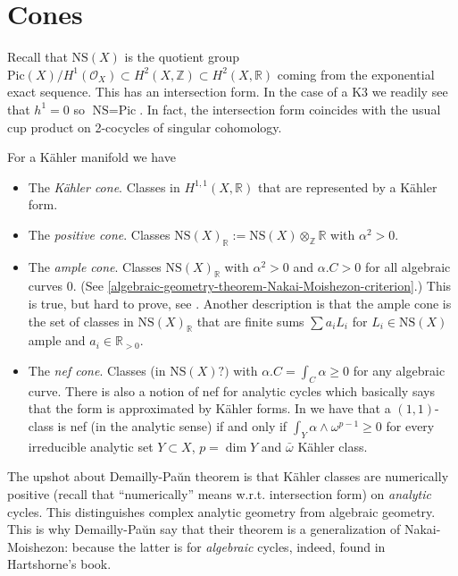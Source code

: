 \section{Cones}
\label{section-cone}

Recall that $\text{NS}(X)$ is the quotient group
$\text{Pic}(X)/H^1(\mathcal{O}_X)\subset H^2(X,\mathbb{Z})
\subset H^2(X,\mathbb{R})$
coming from the exponential exact sequence.
This has an intersection form.
In the case of a K3 we readily see that
$h^1=0$ so $\text{NS}=\text{Pic}$.
In fact, the intersection form coincides with
the usual cup product on 2-cocycles of singular cohomology.

For a Kähler manifold we have
\begin{itemize}
\item The {\it Kähler cone}. Classes 
in $H^{1,1}(X,\mathbb{R})$ that are represented by a
Kähler form.

\item The {\it positive cone}. Classes $\text{NS}(X)_\mathbb{R}
:=\text{NS}(X) \otimes_\mathbb{Z}\mathbb{R}$
with $\alpha^2>0$.

\item The {\it ample cone}. Classes $\text{NS}(X)_\mathbb{R}$
with $\alpha^2>0$ and $\alpha.C>0$ for all algebraic curves 0.
(See \ref{algebraic-geometry-theorem-Nakai-Moishezon-criterion}.)
This is true, but hard to prove, see
\cite[p. 150]{huk}.
Another description is that the ample cone
is the set of classes in $\text{NS}(X)_\mathbb{R}$
that are finite sums $\sum a_iL_i$ 
for $L_i \in \text{NS}(X)$ ample
and $a_i \in \mathbb{R}_{>0}$.

\item The {\it nef cone}. Classes (in $\text{NS}(X)?)$
with $\alpha.C=\int_C\alpha\geq 0$ for any algebraic curve.
There is also a notion of nef for analytic cycles
which basically says that the form is approximated
by Kähler forms.
In \cite[Theorem 4.7(ii)]{Demailly-Paun} we have that
a $(1,1)$-class is nef (in the analytic sense) if and only if
$\int_Y \alpha\wedge\omega^{p-1}\geq 0$ for every
irreducible analytic set $Y \subset X$, $p=\dim Y$
and $\bar{\omega}$ Kähler class.

\end{itemize}

\noindent
The upshot about Demailly-Pa\u un theorem
is that Kähler classes are numerically positive
(recall that ``numerically'' means w.r.t. intersection form)
on {\it analytic} cycles. This distinguishes
complex analytic geometry from algebraic geometry.
This is why Demailly-Pa\u un say that 
their theorem is a generalization of Nakai-Moishezon:
because the latter is for {\it algebraic} cycles,
indeed, found in Hartshorne's book.

